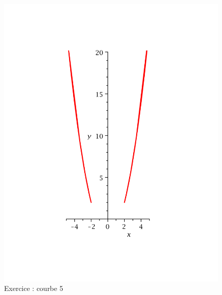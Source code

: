 \begin{figure}[ht]
   \centering
   \includegraphics[scale=0.25]{Ecr01_5.pdf}
   \caption{Exercice  : courbe 5}
\end{figure}
